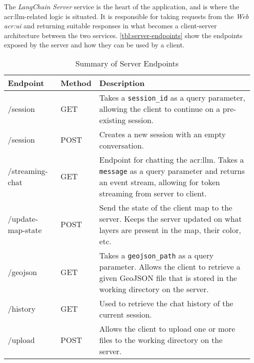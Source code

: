 The \textit{LangChain Server} service is the heart of the application, and is where the \gls{acr:llm}-related logic is situated. It is responsible for taking requests from the \textit{Web \acrshort{acr:ui}} and returning suitable responses in what becomes a client-server architecture between the two services. \autoref{tbl:server-endpoints} show the endpoints exposed by the server and how they can be used by a client.

\begin{table}[h]
    \centering
    \caption{Summary of Server Endpoints}
    \label{tbl:server-endpoints}
    \begin{tabular}{p{}p{}p{}}
        \toprule
        \textbf{Endpoint} & \textbf{Method} & \textbf{Description}                                                                                                                                                         \\
        \midrule
        /session          & GET             & Takes a \texttt{session\_id} as a query parameter, allowing the client to continue on a pre-existing session.                                                                \\
        /session          & POST            & Creates a new session with an empty conversation.                                                                                                                            \\
        /streaming-chat   & GET             & Endpoint for chatting the \acrshort{acr:llm}. Takes a \texttt{message} as a query parameter and returns an event stream, allowing for token streaming from server to client. \\
        /update-map-state & POST            & Send the state of the client map to the server. Keeps the server updated on what layers are present in the map, their color, etc.                                            \\
        /geojson          & GET             & Takes a \texttt{geojson\_path} as a query parameter. Allows the client to retrieve a given GeoJSON file that is stored in the working directory on the server.               \\
        /history          & GET             & Used to retrieve the chat history of the current session.                                                                                                                    \\
        /upload           & POST            & Allows the client to upload one or more files to the working directory on the server.                                                                                        \\
        \bottomrule
    \end{tabular}
\end{table}


